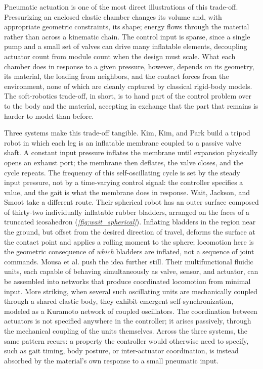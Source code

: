 Pneumatic actuation is one of the most direct illustrations of this trade-off. Pressurizing an enclosed elastic chamber changes its volume and, with appropriate geometric constraints, its shape; energy flows through the material rather than across a kinematic chain. The control input is sparse, since a single pump and a small set of valves can drive many inflatable elements, decoupling actuator count from module count when the design must scale. What each chamber does in response to a given pressure, however, depends on its geometry, its material, the loading from neighbors, and the contact forces from the environment, none of which are cleanly captured by classical rigid-body models. The soft-robotics trade-off, in short, is to hand part of the control problem over to the body and the material, accepting in exchange that the part that remains is harder to model than before.

Three systems make this trade-off tangible. Kim, Kim, and Park \cite{kimSimpleTripodMobile2019} build a tripod robot in which each leg is an inflatable membrane coupled to a passive valve shaft. A constant input pressure inflates the membrane until expansion physically opens an exhaust port; the membrane then deflates, the valve closes, and the cycle repeats. The frequency of this self-oscillating cycle is set by the steady input pressure, not by a time-varying control signal: the controller specifies a value, and the gait is what the membrane does in response. Wait, Jackson, and Smoot \cite{waitSelfLocomotionSpherical2010} take a different route. Their spherical robot has an outer surface composed of thirty-two individually inflatable rubber bladders, arranged on the faces of a truncated icosahedron (\textit{\cref{fig:wait_spherical}}). Inflating bladders in the region near the ground, but offset from the desired direction of travel, deforms the surface at the contact point and applies a rolling moment to the sphere; locomotion here is the geometric consequence of \textit{which} bladders are inflated, not a sequence of joint commands. Mousa et al. \cite{mousaMultifunctionalFluidicUnits} push the idea further still. Their multifunctional fluidic units, each capable of behaving simultaneously as valve, sensor, and actuator, can be assembled into networks that produce coordinated locomotion from minimal input. More striking, when several such oscillating units are mechanically coupled through a shared elastic body, they exhibit emergent self-synchronization, modeled as a Kuramoto network of coupled oscillators. The coordination between actuators is not specified anywhere in the controller; it arises passively, through the mechanical coupling of the units themselves. Across the three systems, the same pattern recurs: a property the controller would otherwise need to specify, such as gait timing, body posture, or inter-actuator coordination, is instead absorbed by the material's own response to a small pneumatic input.

